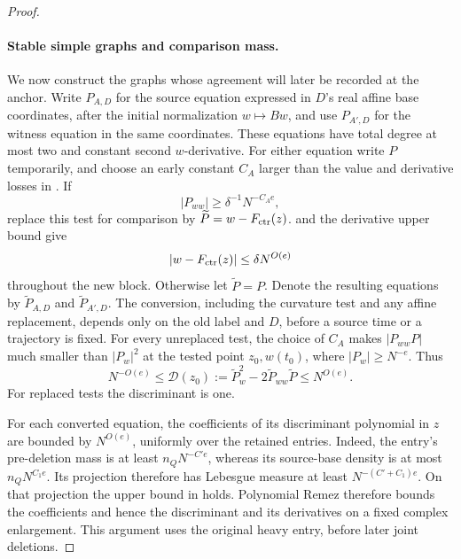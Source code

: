 \begin{proof}
\paragraph{Stable simple graphs and comparison mass.}
We now construct the graphs whose agreement will later be recorded
at the anchor.  Write \(P_{A,D}\) for the source equation expressed
in \(D\)'s real affine base coordinates, after the initial
normalization \(w\mapsto Bw\), and use \(P_{A',D}\) for the
witness equation in the same coordinates.  These equations have
total degree at most two and constant second \(w\)-derivative.
For either equation write \(P\) temporarily, and choose an early
constant \(C_A\)
larger than the value and derivative losses in
.  If
\[
 |P_{ww}|\ge\delta^{-1}N^{-C_Ae},
\]
replace this test for comparison by
\(\widetilde P=w-F_{\rm ctr}(z)\).   and the derivative upper bound
give
\[
 |w-F_{\rm ctr}(z)|\le\delta N^{O(e)}
\]
throughout the new block.  Otherwise let \(\widetilde P=P\).
Denote the resulting equations by \(\widetilde P_{A,D}\) and
\(\widetilde P_{A',D}\).  The conversion, including the curvature
test and any affine replacement, depends only on the old label and
\(D\), before a source time or a trajectory is fixed.
For every unreplaced test, the choice of \(C_A\) makes
\(|P_{ww}P|\) much smaller than \(|P_w|^2\) at the tested
point \(z_0,w(t_0)\), where \(|P_w|\ge N^{-e}\).
Thus
\begin{equation}
 N^{-O(e)}\le
 \mathcal D(z_0):=
 \widetilde P_w^2-2\widetilde P_{ww}\widetilde P
 \le N^{O(e)}.
 \label{a02:source-discriminant}
\end{equation}
For replaced tests the discriminant is one.

For each converted equation, the coefficients of its discriminant
polynomial in \(z\) are bounded by
\(N^{O(e)}\), uniformly over the retained entries.
Indeed, the entry's pre-deletion mass is at least
\(n_QN^{-C'e}\), whereas its source-base density is at most
\(n_QN^{C_1e}\).  Its projection therefore has Lebesgue measure
at least \(N^{-(C'+C_1)e}\).  On that projection the upper bound in
 holds.  Polynomial Remez
therefore bounds the coefficients and hence the discriminant
and its derivatives on a fixed complex enlargement.
This argument uses the original heavy entry, before later
joint deletions.


\end{proof}
